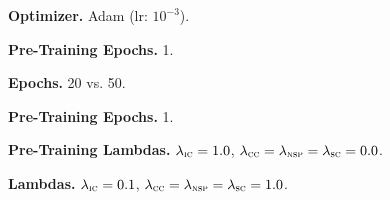 \noindent\textbf{Optimizer.} Adam (lr: $10^{-3}$).

\noindent\textbf{Pre-Training Epochs.} 1.

\noindent\textbf{Epochs.} 20 vs. 50.

\noindent\textbf{Pre-Training Epochs.} 1.

\noindent\textbf{Pre-Training Lambdas.} $\lambda_{\textsc{ic}} = 1.0$, $\lambda_{\textsc{cc}} = \lambda_{\textsc{nsp}} = \lambda_{\textsc{sc}} = 0.0$.

\noindent\textbf{Lambdas.} $\lambda_{\textsc{ic}} = 0.1$, $\lambda_{\textsc{cc}} = \lambda_{\textsc{nsp}} = \lambda_{\textsc{sc}} = 1.0$.



